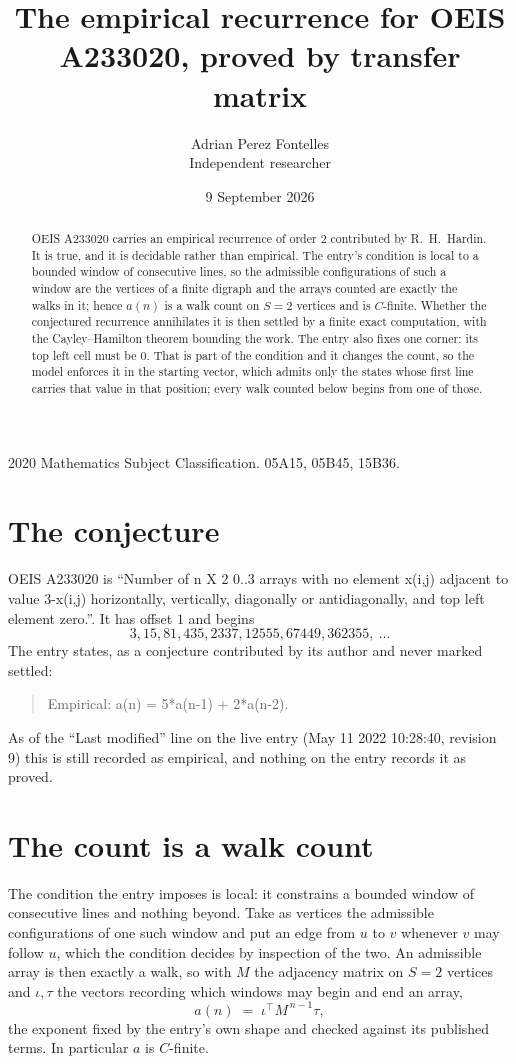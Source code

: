 \documentclass[11pt,a4paper]{article}
\title{The empirical recurrence for OEIS A233020, proved by transfer matrix}
\author{Adrian Perez Fontelles\\ \small Independent researcher}
\date{9 September 2026}
\theoremstyle{plain}
\theoremstyle{definition}
\begin{document}
\maketitle

\begin{abstract}
OEIS A233020 carries an empirical recurrence of order $2$ contributed by R.~H.~Hardin. It is
true, and it is decidable rather than empirical. The entry's condition is local to a bounded window of consecutive lines, so
the admissible configurations of such a window are the vertices of a finite digraph and the
arrays counted are exactly the walks in it; hence $a(n)$ is a walk count on $S=2$ vertices
and is $C$-finite. Whether the conjectured recurrence annihilates it is then settled by a
finite exact computation, with the Cayley--Hamilton theorem bounding the work.
 The entry also fixes one corner: its top left cell must be $0$. That is part of the condition and it changes the count, so the model enforces it in the starting vector, which admits only the states whose first line carries that value in that position; every walk counted below begins from one of those.\end{abstract}

\noindent\small 2020 Mathematics Subject Classification. 05A15, 05B45, 15B36.\normalsize

\section{The conjecture}

OEIS A233020 is ``Number of n X 2 0..3 arrays with no element x(i,j) adjacent to value 3-x(i,j) horizontally, vertically, diagonally or antidiagonally, and top left element zero.''. It has offset $1$ and begins
\[
3, 15, 81, 435, 2337, 12555, 67449, 362355,\ \dots
\]
The entry states, as a conjecture contributed by its author and never marked settled:
\begin{quote}
Empirical: a(n) = 5*a(n-1) + 2*a(n-2).
\end{quote}
As of the ``Last modified'' line on the live entry (May 11 2022 10:28:40, revision 9) this is still
recorded as empirical, and nothing on the entry records it as proved.

\section{The count is a walk count}

The condition the entry imposes is local: it constrains a bounded window of consecutive lines and nothing beyond. Take as
vertices the admissible configurations of one such window and put an edge from $u$ to $v$
whenever $v$ may follow $u$, which the condition decides by inspection of the two. An
admissible array is then exactly a walk, so with $M$ the adjacency matrix on $S=2$ vertices
and $\iota,\tau$ the vectors recording which windows may begin and end an array,
\[
a(n)\;=\;\iota^{\!\top}M^{\,n-1}\tau ,
\]
the exponent fixed by the entry's own shape and checked against its published terms. In
particular $a$ is $C$-finite.
\end{document}
